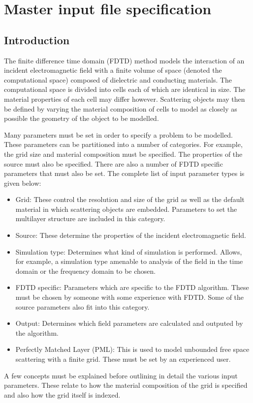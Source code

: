\documentclass[a4paper, 12pt]{article}
\begin{document}
	\section{Master input file specification}
	\subsection{Introduction}
	The finite difference time domain (FDTD) method models the interaction of an incident electromagnetic
	field with a finite volume of space (denoted the computational space)
	composed of dielectric and conducting materials. The computational
	space is divided into cells each of which are identical in size. The
	material properties of each cell may differ however. Scattering
	objects may then be defined by varying the material composition of
	cells to model as closely as possible the geometry of the object to be modelled.

	Many parameters must be set in order to specify a problem to be
	modelled. These parameters can be partitioned into a number of
	categories. For example, the grid size and material composition must
	be specified. The properties of the source must also be
	specified. There are also a number of FDTD specific parameters that must
	also be set. The complete list of input parameter types is given
	below:
	\begin{itemize}
		\item Grid: These control the resolution and size of the
		grid as well as the default material in which scattering objects are
		embedded. Parameters to set the multilayer structure are included in
		this category.
		\item Source: These determine the properties of the incident
		electromagnetic field.
		\item Simulation type: Determines what kind of simulation is
		performed. Allows, for example, a simulation type amenable to
		analysis of the field in the time domain or the frequency domain to
		be chosen.
		\item FDTD specific: Parameters which are specific to the FDTD
		algorithm. These must be chosen by someone with some experience with
		FDTD. Some of the source parameters also fit into this category.
		\item Output: Determines which field parameters are calculated and
		outputed by the algorithm.
		\item Perfectly Matched Layer (PML): This is used to model unbounded
		free space scattering with a finite grid. These must be set by an
		experienced user.

	\end{itemize}
	A few concepts must be explained before outlining in detail the
	various input parameters. These relate to how the material composition
	of the grid is specified and also how the grid itself is indexed.
\end{document}

